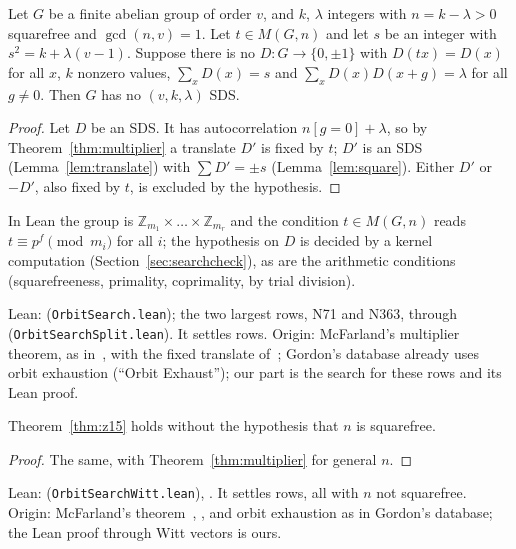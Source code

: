\begin{theorem}\label{thm:z15}
Let $G$ be a finite abelian group of order $v$, and $k$, $\lambda$ integers with
$n = k - \lambda > 0$ squarefree and $\gcd(n, v) = 1$. Let $t \in M(G, n)$ and let $s$ be an
integer with $s^2 = k + \lambda(v - 1)$. Suppose there is no $D \colon G \to \{0, \pm 1\}$ with
$D(tx) = D(x)$ for all $x$, $k$ nonzero values, $\sum_x D(x) = s$ and
$\sum_x D(x)D(x+g) = \lambda$ for all $g \neq 0$. Then $G$ has no $(v, k, \lambda)$ SDS.
\end{theorem}

\begin{proof}
Let $D$ be an SDS. It has autocorrelation $n[g=0] + \lambda$, so by
Theorem~\ref{thm:multiplier} a translate $D'$ is fixed by $t$; $D'$ is an SDS
(Lemma~\ref{lem:translate}) with $\sum D' = \pm s$ (Lemma~\ref{lem:square}). Either $D'$ or
$-D'$, also fixed by $t$, is excluded by the hypothesis.
\end{proof}

\noindent In Lean the group is $\mathbb{Z}_{m_1} \times \dots \times \mathbb{Z}_{m_r}$ and the
condition $t \in M(G, n)$ reads $t \equiv p^f \pmod{m_i}$ for all $i$; the hypothesis on $D$
is decided by a kernel computation (Section~\ref{sec:searchcheck}), as are the arithmetic
conditions (squarefreeness, primality, coprimality, by trial division).

\begin{remark}
Lean:  (\texttt{OrbitSearch.lean}); the two largest rows, N71 and
N363, through  (\texttt{OrbitSearchSplit.lean}). It settles
 rows. Origin: McFarland's multiplier theorem, as in~\cite[Thm.~5.1]{gordon}, with
the fixed translate of~\cite{mcfarland-rice}; Gordon's database already uses orbit exhaustion
(``Orbit Exhaust''); our part is the search for these rows and its Lean proof.
\end{remark}

\begin{theorem}\label{thm:z27}
Theorem~\ref{thm:z15} holds without the hypothesis that $n$ is squarefree.
\end{theorem}

\begin{proof}
The same, with Theorem~\ref{thm:multiplier} for general $n$.
\end{proof}

\begin{remark}
Lean:  (\texttt{OrbitSearchWitt.lean}),
. It settles  rows, all with $n$ not squarefree.
Origin: McFarland's theorem~\cite[Thm.~5.1]{gordon}, \cite[Result~3.2]{tan}, and orbit
exhaustion as in Gordon's database; the Lean proof through Witt vectors is ours.
\end{remark}

